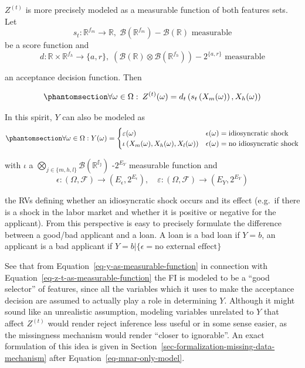\documentclass[
  12pt,
]{article}
\begin{document}
\(Z^{(t)}\) is more precisely modeled as a measurable function of both
features sets. Let \[
s_t : \mathbb{R}^{f_m} \to \mathbb{R}, \; 
\mathcal{B}\left(\mathbb{R}^{f_m}\right)-\mathcal{B}\left(\mathbb{R}\right) \text{ measurable}
\] be a score function and \[
d : \mathbb{R} \times \mathbb{R}^{f_h} \to \{a, r\}, \;
    \left(\mathcal{B}\left(\mathbb{R}\right)
    \otimes
    \mathcal{B}\left(\mathbb{R}^{f_h}\right)\right) - 2^{\{a, r\}}
    \text{ measurable}
\]

an acceptance decision function. Then

\begin{equation}\protect\phantomsection\label{eq-z-t-as-measurable-function}{
\forall \omega \in \Omega: \:
Z^{(t)}(\omega) =
d_t\left(
    s_t\left(X_m(\omega)\right),
    X_h(\omega)
\right)
}\end{equation}

In this spirit, \(Y\) can also be modeled as
\begin{equation}\protect\phantomsection\label{eq-y-as-measurable-function}{
\forall \omega \in \Omega:
Y(\omega) = \begin{cases}
    \varepsilon(\omega) & \epsilon(\omega) = \text{idiosyncratic shock} \\
    \iota \left(X_m(\omega), X_h(\omega), X_l(\omega) \right) & \epsilon(\omega) = \text{no idiosyncratic shock}
\end{cases}
}\end{equation}

with \(\iota\) a
\(\bigotimes_{j \in \{m, h, l\}} \mathcal{B}\left(\mathbb{R^{f_j}}\right)\)
-\(2^{E_Y}\) measurable function and \[
\epsilon : (\Omega, \mathcal{F}) \to \left(E_\epsilon, 2^{E_\epsilon} \right), \quad
\varepsilon : (\Omega, \mathcal{F}) \to \left(E_Y, 2^{E_Y} \right)
\]

the RVs defining whether an idiosyncratic shock occurs and its effect
(e.g.~if there is a shock in the labor market and whether it is positive
or negative for the applicant). From this perspective is easy to
precisely formulate the difference between a good/bad applicant and a
loan. A loan is a bad loan if \(Y = b\), an applicant is a bad applicant
if \(Y = b | \{\epsilon = \text{no external effect}\}\)

See that from Equation~\ref{eq-y-as-measurable-function} in connection
with Equation~\ref{eq-z-t-as-measurable-function} the FI is modeled to
be a ``good selector'' of features, since all the variables which it
uses to make the acceptance decision are assumed to actually play a role
in determining \(Y\). Although it might sound like an unrealistic
assumption, modeling variables unrelated to \(Y\) that affect
\(Z^{(t)}\) would render reject inference less useful or in some sense
easier, as the missingness mechanism would render ``closer to
ignorable''. An exact formulation of this idea is given in
Section~\ref{sec-formalization-missing-data-mechanism} after
Equation~\ref{eq-mnar-only-model}.
\end{document}
